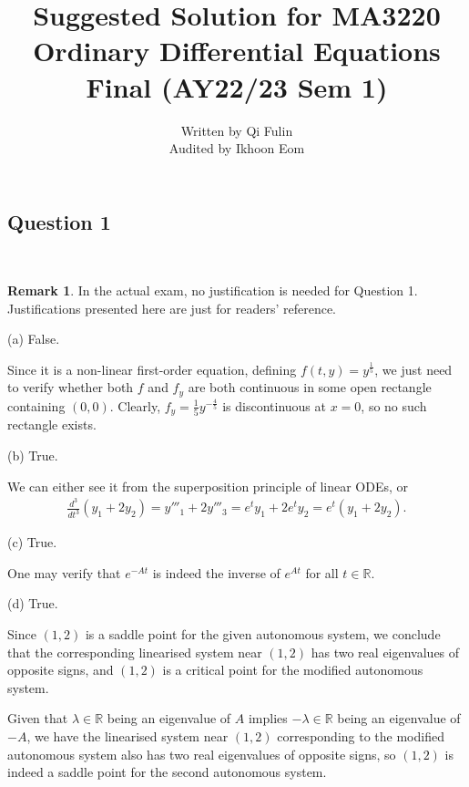 \documentclass[12pt]{amsart}
\theoremstyle{plain}
\theoremstyle{definition}
\newtheorem{remark}[theorem]{Remark}
\def\mb{\mathbb}
\begin{document}
\title{Suggested Solution for MA3220 Ordinary Differential Equations Final (AY22/23 Sem 1)}
\author{Written by Qi Fulin\\ Audited by Ikhoon Eom}







\maketitle

\subsection*{Question 1} \ 
\begin{remark}
	In the actual exam, no justification is needed for Question 1. Justifications presented here are just for readers' reference.
\end{remark}
(a) False.

Since it is a non-linear first-order equation, defining $f(t,y)=y^\frac15$, we just need to verify whether both $f$ and $f_y$ are both continuous in some open rectangle containing $(0,0)$. Clearly, $f_y=\frac15y^{-\frac45}$ is discontinuous at $x=0$, so no such rectangle exists. 

(b) True. 

We can either see it from the superposition principle of linear ODEs, or
\begin{align*}
	\frac{d^3}{dt^3}(y_1+2y_2)=y'''_1+2y'''_3=e^ty_1+2e^ty_2=e^t(y_1+2y_2).
\end{align*}

(c) True.

One may verify that $e^{-At}$ is indeed the inverse of $e^{At}$ for all $t\in\mb R$.

(d) True.

Since $(1,2)$ is a saddle point for the given autonomous system, we conclude that the corresponding linearised system near $(1,2)$ has two real eigenvalues of opposite signs, and $(1,2)$ is a critical point for the modified autonomous system. 

Given that $\lambda\in\mb R$ being an eigenvalue of $A$ implies $-\lambda\in\mb R$ being an eigenvalue of $-A$, we have the linearised system near $(1,2)$ corresponding to the modified autonomous system also has two real eigenvalues of opposite signs, so $(1,2)$ is indeed a saddle point for the second autonomous system.
\end{document}
